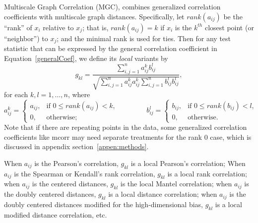 \documentclass[11pt]{article}
\newcommand{\cs}[1]{{\color{blue}{#1}}}
\begin{document}
Multiscale Graph Correlation (MGC), combines generalized correlation coefficients with multiscale graph distances.  Specifically, let $rank(a_{ij})$  be the ``rank'' of $x_i$ relative to $x_j$; that is, $rank(a_{ij})=k$ if $x_i$ is the $k^{th}$ closest point (or ``neighbor'') to $x_j$; and the minimal rank is used for ties.  Then for any test statistic that can be expressed by the general correlation coefficient in Equation~\ref{generalCoef}, we define its \emph{local} variants by
\begin{equation}
\label{localCoef}
g_{kl}=\frac{\sum_{i,j=1}^n a_{ij}^k b_{ij}^l}{\sqrt{\sum_{i,j=1}^n  a_{ij}^{k} a_{ij}^{k} \sum_{i,j=1}^n b_{ij}^{l} b_{ij}^{l}}},
\end{equation}
for each $k,l=1,\ldots,n$, where
\begin{equation}
\label{localCoef2}
    a_{ij}^k=
    \begin{cases}
      a_{ij}, & \text{if } 0 \leq rank(a_{ij}) < k, \\
      0, & \text{otherwise};
    \end{cases} \qquad \qquad
    b_{ij}^l=
    \begin{cases}
      b_{ij}, & \text{if } 0 \leq rank(b_{ij}) < l, \\
      0, & \text{otherwise}.
    \end{cases}
\end{equation}
Note that if there are repeating points in the data, some generalized correlation coefficients like mcorr may need separate treatments for the rank $0$ case, which is discussed in appendix section~\ref{appen:methods}.

\cs{Since the repeating points is no longer a major issue as we no longer use re-sampling with replacement, I moved the tie problems to a short paragraph in the appendix mcorr section, so the main paper looks clearer.}

When $a_{ij}$ is the Pearson's correlation, $g_{kl}$ is a local Pearson's correlation;
When $a_{ij}$ is the Spearman or Kendall's rank correlation, $g_{kl}$ is a local rank correlation;
when $a_{ij}$ is the centered distances, $g_{kl}$ is the local Mantel correlation;
when $a_{ij}$ is the doubly centered distances, $g_{kl}$ is a local distance correlation;
when $a_{ij}$ is the doubly centered distances modified for the high-dimensional bias, $g_{kl}$ is a local modified distance correlation, etc.
\end{document}
